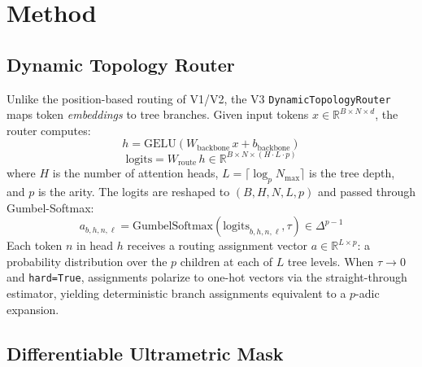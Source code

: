 \documentclass[11pt,a4paper]{article}
\begin{document}
\section{Method}

\subsection{Dynamic Topology Router}

Unlike the position-based routing of V1/V2, the V3 \texttt{DynamicTopologyRouter} maps token \emph{embeddings} to tree branches. Given input tokens $x \in \mathbb{R}^{B \times N \times d}$, the router computes:
\begin{equation}
    h = \text{GELU}(W_{\text{backbone}}\, x + b_{\text{backbone}})
\end{equation}
\begin{equation}
    \text{logits} = W_{\text{route}}\, h \in \mathbb{R}^{B \times N \times (H \cdot L \cdot p)}
\end{equation}
where $H$ is the number of attention heads, $L = \lceil \log_p N_{\max} \rceil$ is the tree depth, and $p$ is the arity. The logits are reshaped to $(B, H, N, L, p)$ and passed through Gumbel-Softmax:
\begin{equation}
    a_{b,h,n,\ell} = \text{GumbelSoftmax}\!\left(\text{logits}_{b,h,n,\ell}, \tau\right) \in \Delta^{p-1}
\end{equation}
Each token $n$ in head $h$ receives a routing assignment vector $a \in \mathbb{R}^{L \times p}$: a probability distribution over the $p$ children at each of $L$ tree levels. When $\tau \to 0$ and \texttt{hard=True}, assignments polarize to one-hot vectors via the straight-through estimator, yielding deterministic branch assignments equivalent to a $p$-adic expansion.

\subsection{Differentiable Ultrametric Mask}
\end{document}
